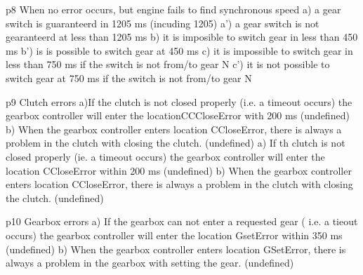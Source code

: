  
 p8 When no error occurs, but engine fails to find synchronous speed
 a) a gear switch is guaranteerd in 1205 ms (incuding 1205)
 a') a gear switch is not gearanteerd at less than 1205 ms
 b) it is imposible to switch gear in less than 450 ms
 b') is is possible to switch gear at 450 ms
 c) it is impossible to switch gear in less than 750 ms if the switch is not from/to gear N
 c') it is not possible to switch gear at 750 ms if the switch is not from/to gear N
 
 
 p9 Clutch errors
 a)If the clutch is not closed properly (i.e. a timeout occurs) the gearbox  controller will enter the locationCCCloseError with 200 ms   (undefined)
 b)  When the gearbox controller enters location CCloseError, there is always a problem in the clutch with closing the clutch.  (undefined)
 a) If th clutch is not closed properly (ie. a timeout occurs) the gearbox controller will enter the location CCloseError within 200 ms (undefined)
 b) When the gearbox controller enters location CCloseError, there is always a problem in the clutch with closing the clutch. (undefined)
 
 
 p10 Gearbox errors  
 a) If the gearbox can not enter a requested gear ( i.e. a tieout occurs) the gearbox controller will enter the location GsetError within 350 ms (undefined)
 b) When the gearbox controller enters location GSetError, there is always a problem in the gearbox with setting the gear. (undefined)
 
